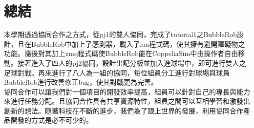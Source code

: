 \chapter{總結}
本學期透過協同合作之方式，從pj1的雙人協同，完成了tutorial1之BubbleRob設計，且在BubbleRob中加上了感測器，載入了lua程式碼，使其擁有避開障礙物之功能。隨後對其加上zmq程式碼使BubbleRob能在CoppeliaSim中由操作者自由移動。接著進入了四人的pj2協同，設計出記分板並加入進球場中，即可進行雙人之足球對戰。再來進行了八人為一組的協同，每位組員分工進行對球場與球員BubbleRob進行改善修正bug，使其對戰更為完善。\\

協同合作可以讓我們對一個項目的開發效率提高，組員可以針對自己的專長與能力來進行任務分配。且協同合作具有共享資源特性，組員之間可以互相學習和激發出創新的想法。隨著科技在不斷的進步，我們為了跟上世界的發展，利用協同合作產品開發的方式是必不可少的。\\